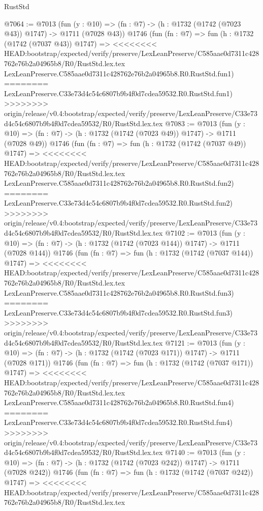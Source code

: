\begin{lexlean}{RustStd}
\begin{coremodule}
{\begin{coremodule}
{{{{{{{{{{{{{@7064 := @7013
    (fun (y : @10) => (fn : @7) -> (h : @1732 (@1742 (@7023 @43)) @1747) -> @1711 (@7028 @43))
    @1746
    (fun (fn : @7) =>
    fun (h : @1732 (@1742 (@7037 @43)) @1747) =>
<<<<<<<< HEAD:bootstrap/expected/verify/preserve/LexLeanPreserve/C585aae0d7311c428762e76b2a04965b8/R0/RustStd.lex.tex
    LexLeanPreserve.C585aae0d7311c428762e76b2a04965b8.R0.RustStd.fun1)
========
    LexLeanPreserve.C33e73d4c54c6807b9b4f0d7cdea59532.R0.RustStd.fun1)
>>>>>>>> origin/release/v0.4:bootstrap/expected/verify/preserve/LexLeanPreserve/C33e73d4c54c6807b9b4f0d7cdea59532/R0/RustStd.lex.tex
@7083 := @7013
    (fun (y : @10) => (fn : @7) -> (h : @1732 (@1742 (@7023 @49)) @1747) -> @1711 (@7028 @49))
    @1746
    (fun (fn : @7) =>
    fun (h : @1732 (@1742 (@7037 @49)) @1747) =>
<<<<<<<< HEAD:bootstrap/expected/verify/preserve/LexLeanPreserve/C585aae0d7311c428762e76b2a04965b8/R0/RustStd.lex.tex
    LexLeanPreserve.C585aae0d7311c428762e76b2a04965b8.R0.RustStd.fun2)
========
    LexLeanPreserve.C33e73d4c54c6807b9b4f0d7cdea59532.R0.RustStd.fun2)
>>>>>>>> origin/release/v0.4:bootstrap/expected/verify/preserve/LexLeanPreserve/C33e73d4c54c6807b9b4f0d7cdea59532/R0/RustStd.lex.tex
@7102 := @7013
    (fun (y : @10) => (fn : @7) -> (h : @1732 (@1742 (@7023 @144)) @1747) -> @1711 (@7028 @144))
    @1746
    (fun (fn : @7) =>
    fun (h : @1732 (@1742 (@7037 @144)) @1747) =>
<<<<<<<< HEAD:bootstrap/expected/verify/preserve/LexLeanPreserve/C585aae0d7311c428762e76b2a04965b8/R0/RustStd.lex.tex
    LexLeanPreserve.C585aae0d7311c428762e76b2a04965b8.R0.RustStd.fun3)
========
    LexLeanPreserve.C33e73d4c54c6807b9b4f0d7cdea59532.R0.RustStd.fun3)
>>>>>>>> origin/release/v0.4:bootstrap/expected/verify/preserve/LexLeanPreserve/C33e73d4c54c6807b9b4f0d7cdea59532/R0/RustStd.lex.tex
@7121 := @7013
    (fun (y : @10) => (fn : @7) -> (h : @1732 (@1742 (@7023 @171)) @1747) -> @1711 (@7028 @171))
    @1746
    (fun (fn : @7) =>
    fun (h : @1732 (@1742 (@7037 @171)) @1747) =>
<<<<<<<< HEAD:bootstrap/expected/verify/preserve/LexLeanPreserve/C585aae0d7311c428762e76b2a04965b8/R0/RustStd.lex.tex
    LexLeanPreserve.C585aae0d7311c428762e76b2a04965b8.R0.RustStd.fun4)
========
    LexLeanPreserve.C33e73d4c54c6807b9b4f0d7cdea59532.R0.RustStd.fun4)
>>>>>>>> origin/release/v0.4:bootstrap/expected/verify/preserve/LexLeanPreserve/C33e73d4c54c6807b9b4f0d7cdea59532/R0/RustStd.lex.tex
@7140 := @7013
    (fun (y : @10) => (fn : @7) -> (h : @1732 (@1742 (@7023 @242)) @1747) -> @1711 (@7028 @242))
    @1746
    (fun (fn : @7) =>
    fun (h : @1732 (@1742 (@7037 @242)) @1747) =>
<<<<<<<< HEAD:bootstrap/expected/verify/preserve/LexLeanPreserve/C585aae0d7311c428762e76b2a04965b8/R0/RustStd.lex.tex
}}}}}}}}}}}}}
\end{coremodule}}
\end{coremodule}
\end{lexlean}
